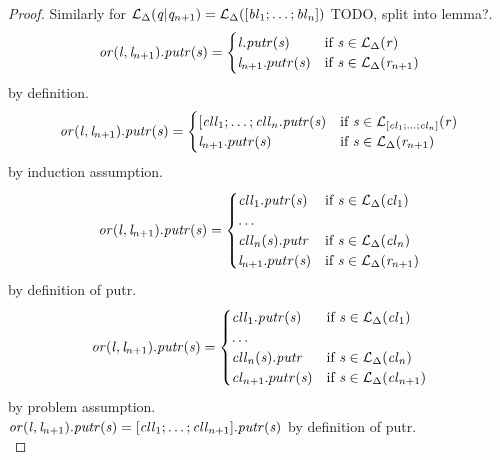 \begin{lemma}
\begin{proof}
Similarly for
$\mathcal{L}_{\Delta}(\mathit{q}|\mathit{q}_{n+1})
= \mathcal{L}_{\Delta}([\mathit{bl}_1; \ldots ; \mathit{bl}_n])$ TODO, split into lemma?.\\
\[
\mathit{or}(\mathit{l},\mathit{l}_{n+1})\mathit{.putr}(\mathit{s}) =
  \begin{cases}
    \mathit{l}\mathit{.putr}(\mathit{s})& \text{if } \mathit{s} \in \mathcal{L}_{\Delta}(\mathit{r})\\
    \mathit{l}_{n+1}.putr(\mathit{s})& \text{if } \mathit{s} \in \mathcal{L}_{\Delta}(\mathit{r}_{n+1})
  \end{cases}
\] by definition.\\
\[
\mathit{or}(\mathit{l},\mathit{l}_{n+1})\mathit{.putr}(\mathit{s}) =
  \begin{cases}
    [\mathit{cll}_1;\ldots;\mathit{cll}_n\mathit{.putr}(\mathit{s})& \text{if } \mathit{s} \in \mathcal{L}_{[\mathit{cl}_1 ; \ldots ; \mathit{cl}_n]}(\mathit{r})\\
    \mathit{l}_{n+1}.putr(\mathit{s})& \text{if } \mathit{s} \in \mathcal{L}_{\Delta}(\mathit{r}_{n+1})
  \end{cases}
\] by induction assumption.\\
\[
\mathit{or}(\mathit{l},\mathit{l}_{n+1})\mathit{.putr}(\mathit{s}) =
  \begin{cases}
    \mathit{cll}_1\mathit{.putr}(\mathit{s})& \text{if } \mathit{s} \in \mathcal{L}_{\Delta}(\mathit{cl}_1)\\
\ldots \\
    \mathit{cll}_n(\mathit{s})\mathit{.putr}& \text{if } \mathit{s} \in \mathcal{L}_{\Delta}(\mathit{cl}_n)\\
    \mathit{l}_{n+1}.putr(\mathit{s})& \text{if } \mathit{s} \in \mathcal{L}_{\Delta}(\mathit{r}_{n+1})
  \end{cases}
\] by definition of putr.\\
\[
\mathit{or}(\mathit{l},\mathit{l}_{n+1})\mathit{.putr}(\mathit{s}) =
  \begin{cases}
    \mathit{cll}_1\mathit{.putr}(\mathit{s})& \text{if } \mathit{s} \in \mathcal{L}_{\Delta}(\mathit{cl}_1)\\
\ldots \\
    \mathit{cll}_n(\mathit{s})\mathit{.putr}& \text{if } \mathit{s} \in \mathcal{L}_{\Delta}(\mathit{cl}_n)\\
    \mathit{cl}_{n+1}.putr(\mathit{s})& \text{if } \mathit{s} \in \mathcal{L}_{\Delta}(\mathit{cl}_{n+1})
  \end{cases}
\] by problem assumption.\\
$\mathit{or}(\mathit{l},\mathit{l}_{n+1})\mathit{.putr}(\mathit{s}) =
[\mathit{cll}_1; \ldots ; \mathit{cll}_{n+1}]\mathit{.putr}(\mathit{s})$ by definition of putr.\\
\end{proof}
\end{lemma}


